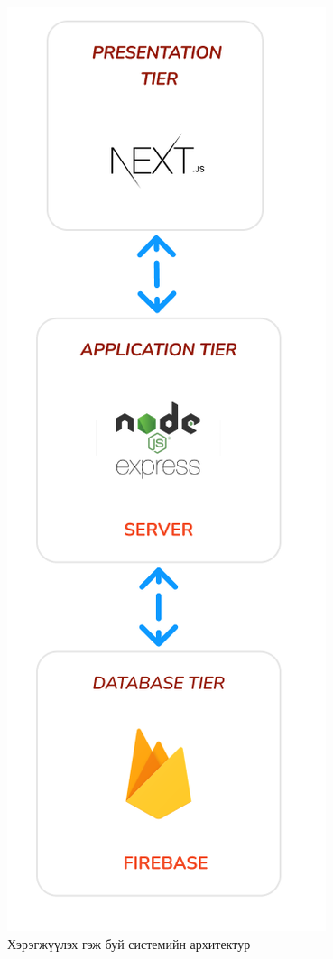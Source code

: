 \begin{figure}[h]
	\centering
	\includegraphics[scale=0.9]{images/imp-diag.png}
	\caption{Хэрэгжүүлэх гэж буй системийн архитектур}
	\label{fig:imp-architecture}
\end{figure}

